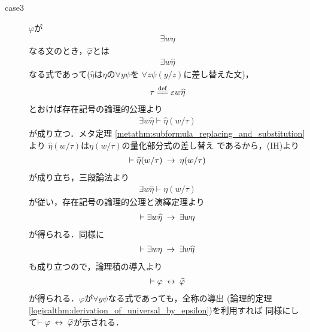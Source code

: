 \begin{sketch}
\begin{description}
\begin{description}
				\item[case3] $\varphi$が
					\begin{align}
						\exists w \eta
					\end{align}
					なる文のとき，$\widehat{\varphi}$とは
					\begin{align}
						\exists w \widehat{\eta}
					\end{align}
					なる式であって($\widehat{\eta}$は$\eta$の$\forall y \psi$を
					$\forall z \psi(y/z)$に差し替えた文)，
					\begin{align}
						\tau \defeq \varepsilon w \widehat{\eta}
					\end{align}
					とおけば存在記号の論理的公理より
					\begin{align}
						\exists w \widehat{\eta} \vdash \widehat{\eta}(w/\tau)
					\end{align}
					が成り立つ．メタ定理
					\ref{metathm:subformula_replacing_and_substitution}より
					$\widehat{\eta}(w/\tau)$は$\eta(w/\tau)$の量化部分式の差し替え
					であるから，(IH)より
					\begin{align}
						\vdash \widehat{\eta}(w/\tau) \hspace{0.25em}\rightarrow\hspace{0.25em} \eta(w/\tau)
					\end{align}
					が成り立ち，三段論法より
					\begin{align}
						\exists w \widehat{\eta} \vdash \eta(w/\tau)
					\end{align}
					が従い，存在記号の論理的公理と演繹定理より
					\begin{align}
						\vdash \exists w \widehat{\eta} \hspace{0.25em}\rightarrow\hspace{0.25em} \exists w \eta
					\end{align}
					が得られる．同様に
					\begin{align}
						\vdash \exists w \eta \hspace{0.25em}\rightarrow\hspace{0.25em} \exists w \widehat{\eta}
					\end{align}
					も成り立つので，論理積の導入より
					\begin{align}
						\vdash \varphi \hspace{0.25em}\leftrightarrow\hspace{0.25em} \widehat{\varphi}
					\end{align}
					が得られる．$\varphi$が$\forall y \psi$なる式であっても，全称の導出
					(論理的定理
					\ref{logicalthm:derivation_of_universal_by_epsilon})を利用すれば
					同様にして$\vdash \varphi \hspace{0.25em}\leftrightarrow\hspace{0.25em} \widehat{\varphi}$が示される．
					\QED

\end{description}
\end{description}
\end{sketch}
